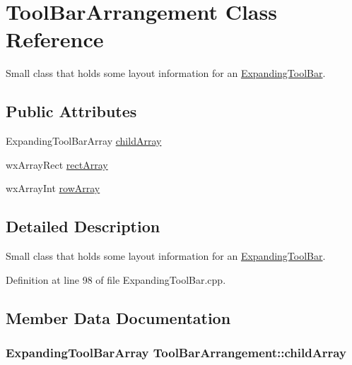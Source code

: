 \hypertarget{class_tool_bar_arrangement}{}\section{Tool\+Bar\+Arrangement Class Reference}
\label{class_tool_bar_arrangement}


Small class that holds some layout information for an \hyperlink{class_expanding_tool_bar}{Expanding\+Tool\+Bar}.  


\subsection*{Public Attributes}
\begin{DoxyCompactItemize}
\item 
Expanding\+Tool\+Bar\+Array \hyperlink{class_tool_bar_arrangement_aaf1ea4bfcdbe26c53b040740b29d18ac}{child\+Array}
\item 
wx\+Array\+Rect \hyperlink{class_tool_bar_arrangement_ab69c99448aa3b522eff4680244b9117e}{rect\+Array}
\item 
wx\+Array\+Int \hyperlink{class_tool_bar_arrangement_a70a5ff918d2e70d284802424ffb1c096}{row\+Array}
\end{DoxyCompactItemize}


\subsection{Detailed Description}
Small class that holds some layout information for an \hyperlink{class_expanding_tool_bar}{Expanding\+Tool\+Bar}. 

Definition at line 98 of file Expanding\+Tool\+Bar.\+cpp.



\subsection{Member Data Documentation}
\subsubsection[{\texorpdfstring{child\+Array}{childArray}}]{\setlength{\rightskip}{0pt plus 5cm}Expanding\+Tool\+Bar\+Array Tool\+Bar\+Arrangement\+::child\+Array}\hypertarget{class_tool_bar_arrangement_aaf1ea4bfcdbe26c53b040740b29d18ac}{}\label{class_tool_bar_arrangement_aaf1ea4bfcdbe26c53b040740b29d18ac}



